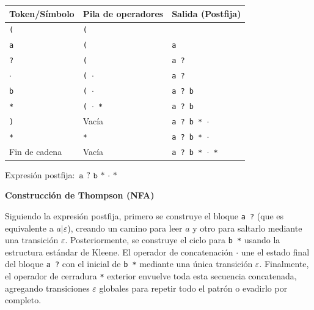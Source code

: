 \documentclass[12pt, letterpaper]{article}
\begin{document}
\begin{enumerate}
\begin{enumerate}
      \begin{center}
        \small
        \begin{tabular}{lll}
          \toprule
          \textbf{Token/Símbolo} & \textbf{Pila de operadores} & \textbf{Salida (Postfija)} \\
          \midrule
          \texttt{(} & \texttt{(} & \\
          \texttt{a} & \texttt{(} & \texttt{a} \\
          \texttt{?} & \texttt{(} & \texttt{a ?} \\
          \texttt{$\cdot$} & \texttt{( $\cdot$} & \texttt{a ?} \\
          \texttt{b} & \texttt{( $\cdot$} & \texttt{a ? b} \\
          \texttt{*} & \texttt{( $\cdot$ *} & \texttt{a ? b} \\
          \texttt{)} & Vacía & \texttt{a ? b * $\cdot$} \\
          \texttt{*} & \texttt{*} & \texttt{a ? b * $\cdot$} \\
          Fin de cadena & Vacía & \texttt{a ? b * $\cdot$ *} \\
          \bottomrule
        \end{tabular}
      \end{center}

      Expresión postfija: $\boxed{\texttt{a ? b * $\cdot$ *}}$

      \textbf{Construcción de Thompson (NFA)}

      Siguiendo la expresión postfija, primero se construye el bloque \texttt{a ?} (que es equivalente a $a|\varepsilon$), creando un camino para leer $a$ y otro para saltarlo mediante una transición $\varepsilon$. Posteriormente, se construye el ciclo para \texttt{b *} usando la estructura estándar de Kleene. El operador de concatenación $\cdot$ une el estado final del bloque \texttt{a ?} con el inicial de \texttt{b *} mediante una única transición $\varepsilon$. Finalmente, el operador de cerradura \texttt{*} exterior envuelve toda esta secuencia concatenada, agregando transiciones $\varepsilon$ globales para repetir todo el patrón o evadirlo por completo.


\end{enumerate}
\end{enumerate}
\end{document}
